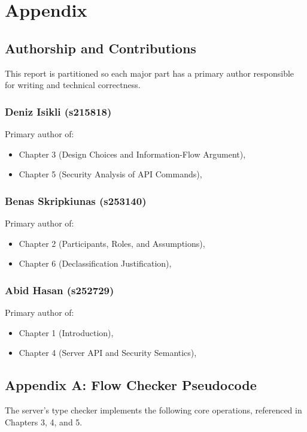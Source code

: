 \section{Appendix}

\subsection{Authorship and Contributions}

This report is partitioned so each major part has a primary author responsible for writing and technical correctness.

\subsubsection*{Deniz Isikli (s215818)}
Primary author of:
\begin{itemize}
    \item Chapter 3 (Design Choices and Information-Flow Argument),
    \item Chapter 5 (Security Analysis of API Commands),
\end{itemize}

\subsubsection*{Benas Skripkiunas (s253140)}
Primary author of:
\begin{itemize}
    \item Chapter 2 (Participants, Roles, and Assumptions),
    \item Chapter 6 (Declassification Justification),
\end{itemize}

\subsubsection*{Abid Hasan (s252729)}
Primary author of:
\begin{itemize}
    \item Chapter 1 (Introduction),
    \item Chapter 4 (Server API and Security Semantics),
\end{itemize}

\subsection{Appendix A: Flow Checker Pseudocode}

The server's type checker implements the following core operations, referenced in Chapters 3, 4, and 5.

